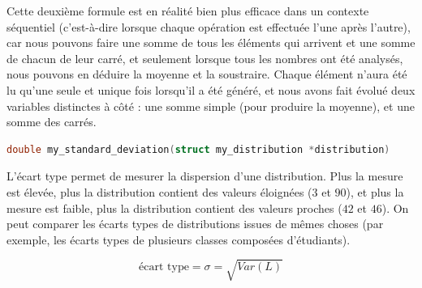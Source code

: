 \documentclass[11pt,a4paper]{article}
\begin{document}
Cette deuxième formule est en réalité bien plus efficace dans un contexte séquentiel (c'est-à-dire lorsque chaque opération est effectuée l'une après l'autre), car nous pouvons faire une somme de tous les éléments qui arrivent et une somme de chacun de leur carré, et seulement lorsque tous les nombres ont été analysés, nous pouvons en déduire la moyenne et la soustraire.
Chaque élément n'aura été lu qu'une seule et unique fois lorsqu'il a été généré, et nous avons fait évolué deux variables distinctes à côté : une somme simple (pour produire la moyenne), et une somme des carrés.

%
%

\bigskip


\begin{lstlisting}[language=C,morekeywords={floor,ceil}]
double my_standard_deviation(struct my_distribution *distribution) \end{lstlisting}

L'écart type permet de mesurer la dispersion d'une distribution.
Plus la mesure est élevée, plus la distribution contient des valeurs éloignées ($ 3 $ et $ 90 $), et plus la mesure est faible, plus la distribution contient des valeurs proches ($ 42 $ et $ 46 $).
On peut comparer les écarts types de distributions issues de mêmes choses (par exemple, les écarts types de plusieurs classes composées d'étudiants).

\begin{center}
\begin{equation*}
\text{écart type} = \sigma = \sqrt{Var(L)}
\end{equation*}
\end{center}


\bigskip


\end{document}
